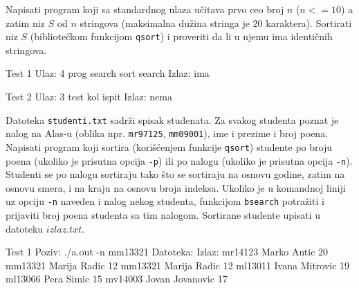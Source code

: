 \begin{Exercise}[label=514]
  Napisati program koji sa standardnog ulaza učitava prvo ceo broj $n$
  ($n <= 10$) a zatim niz $S$ od $n$ stringova (maksimalna dužina
  stringa je $20$ karaktera). Sortirati niz $S$ (bibliotečkom
  funkcijom \verb|qsort|) i proveriti da li u njemu ima identičnih
  stringova.
  
\begin{miditest}
\begin{test}{Test 1}
Ulaz:   4 prog search sort search
Izlaz:  ima
\end{test}
\end{miditest}
\begin{miditest}
\begin{test}{Test 2}
Ulaz:   3 test kol ispit
Izlaz:  nema
\end{test}
\end{miditest}
  
\end{Exercise}

\begin{Exercise}[label=515]
  Datoteka \texttt{studenti.txt} sadrži spisak studenata. Za svakog
  studenta poznat je nalog na Alas-u (oblika npr. \texttt{mr97125},
  \texttt{mm09001}), ime i prezime i broj poena. Napisati program koji
  sortira (korišćenjem funkcije \verb|qsort|) studente po broju
  poena (ukoliko je prisutna opcija \verb"-p") ili po nalogu (ukoliko
  je prisutna opcija \verb"-n"). Studenti se po nalogu sortiraju tako
  što se sortiraju na osnovu godine, zatim na osnovu smera, i na
  kraju na osnovu broja indeksa. Ukoliko je u komandnoj liniji uz
  opciju \verb"-n" naveden i nalog nekog studenta, funkcijom
  \verb|bsearch| potražiti i prijaviti broj poena studenta sa tim
  nalogom. Sortirane studente upisati u datoteku $izlaz.txt$.
  
\begin{maxitest}
\begin{test}{Test 1}
Poziv: ./a.out -n mm13321
Datoteka:                         Izlaz:
mr14123 Marko Antic 20            mm13321 Marija Radic 12
mm13321 Marija Radic 12
ml13011 Ivana Mitrovic 19
ml13066 Pera Simic 15
mv14003 Jovan Jovanovic 17
\end{test}
\end{maxitest}
  
\end{Exercise}

